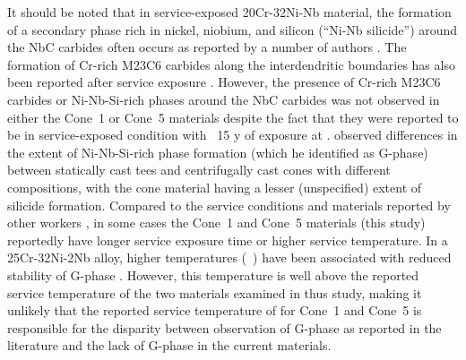 {It should be noted that in service-exposed 20Cr-32Ni-Nb material, the formation of a secondary phase rich in nickel, niobium, and silicon (``Ni-Nb silicide'') around the NbC carbides often occurs as reported by a number of authors \cite{shi_microstructure_2008,hoffman_high_2000-1,knowles_service_2004,patchett_welding_1998}. The formation of Cr-rich M23C6 carbides along the interdendritic boundaries has also been reported after service exposure \cite{shi_microstructure_2008,patchett_welding_1998}. However, the presence of Cr-rich M23C6 carbides or Ni-Nb-Si-rich phases around the NbC carbides was not observed in either the Cone~1 or Cone~5 materials despite the fact that they were reported to be in service-exposed condition with ~15 y of exposure at . \citet{hoffman_high_2000-1} observed differences in the extent of Ni-Nb-Si-rich phase formation (which he identified as G-phase) between statically cast tees and centrifugally cast cones with different compositions, with the cone material having a lesser (unspecified) extent of silicide formation. Compared to the service conditions and materials reported by other workers \cite{hoffman_high_2000-1,patchett_welding_1998,knowles_service_2004,shi_microstructure_2008}, in some cases the Cone~1 and Cone~5 materials (this study) reportedly have longer service exposure time or higher service temperature. In a 25Cr-32Ni-2Nb alloy, higher temperatures (~) have been associated with reduced stability of G-phase \cite{de_almeida_soares_niobium_1992}. However, this temperature is well above the reported service temperature of the two materials examined in thus study, making it unlikely that the reported service temperature of  for Cone~1 and Cone~5 is responsible for the disparity between observation of G-phase as reported in the literature and the lack of G-phase in the current materials. 





}
